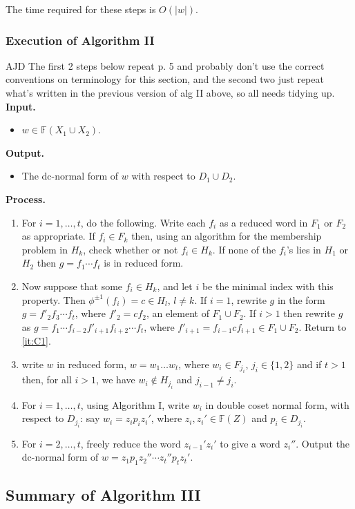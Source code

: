\documentclass[a4paper,12pt]{article}
\numberwithin{equation}{section}
\numberwithin{figure}{section}
\newcommand{\FF}{\ensuremath{\mathbb{F}}}
\newcommand{\be}{\begin{enumerate}}
\newcommand{\ee}{\end{enumerate}}
\newcommand{\biz}{\begin{itemize}}
\newcommand{\eiz}{\end{itemize}}
\newenvironment{ajd1}{\noindent\color{red} AJD }{}
\newcommand{\ajd}[1]{\begin{ajd1} #1 \end{ajd1}}
\begin{document}
\begin{comp}
The time required for these steps is $O(|w|)$.
\end{comp}
\subsubsection{Execution of Algorithm II}\label{sub:summaryII}
\ajd{The first 2 steps below repeat p. 5 and probably don't use
the correct conventions on  terminology for this section, and the second two
just repeat what's written in the previous version of alg II above, so 
all needs tidying up.}
\noindent\textbf{Input.}
\biz
\item $w\in \FF(X_1\cup X_2)$.
\eiz
\noindent\textbf{Output.}
\biz
\item The dc-normal form of $w$ with respect to $D_1\cup D_2$. 
\eiz
\noindent\textbf{Process.}
\be[{C}1]
\item\label{it:C1} For $i=1,\ldots ,t$, do the following.
Write each $f_i$ as  a reduced word in $F_1$ or $F_2$ as appropriate.
If $f_i\in F_k$ then,
using an algorithm for the membership problem in $H_k$, check whether or not
$f_i \in H_k$.
 If none of the $f_i$'s lies in $H_1$ or $H_2$ then
$g= f_1 \cdots f_t$ is in  reduced form.
\item\label{it:C2}  Now suppose that some $f_i \in H_k$,  and let  $i$ be the
minimal index with this property. Then $\phi^{\pm 1}(f_i)=c\in H_{l}$, $l\neq k$.
If $i = 1$, rewrite $g$  in the
form $g = f'_2 f_3 \cdots f_t$,  where  $f'_2 = cf_2$, an element of $F_1\cup F_2$.
If $i > 1$ then rewrite $g$ as
$g = f_1 \cdots f_{i-2} f'_{i+1}f_{i+2} \cdots f_t$, where
$f'_{i+1} = f_{i-1}c f_{i+1}\in F_1\cup F_2$. Return to
\ref{it:C1}.
\item
   write $w$ in reduced form, 
$w=w_1\ldots w_t$, where $w_i\in F_{j_i}$, $j_i\in \{1,2\}$ and if $t>1$ then, 
for all $i>1$, we have $w_i\notin H_{j_i}$  and $j_{i-1}\neq j_i$.  
\item
For $i=1,\ldots ,t$, using Algorithm I,  write $w_i$ in double coset 
normal form, with  respect to $D_{j_i}$: say $w_i=z_ip_iz_i'$, where
$z_i,z_i'\in \FF(Z)$ and $p_i\in D_{j_i}$.  
\item
For $i=2,\ldots, t$, freely reduce the word $z_{i-1}'z_i'$ to give
a word $z_i''$. Output the  dc-normal form of $w= 
z_1p_1z_2'' \cdots z_t''p_tz_t'$. 
\ee
\subsection{Summary of Algorithm III}\label{sub:summaryIII}
\end{document}
